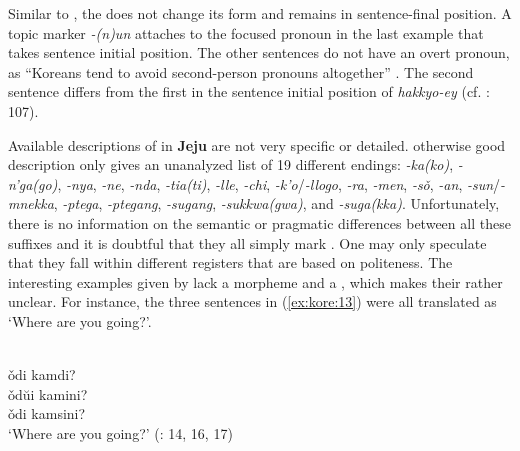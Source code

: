 \noindent Similar to , the  does not change its form and remains in sen\-tence-final position. A topic marker \textit{-(n)un} attaches to the focused pronoun in the last example that takes sentence initial position. The other sentences do not have an overt pronoun, as “Koreans tend to avoid second-person pronouns altogether” \citep[75]{Song2005}. The second sentence differs from the first in the sentence initial position of \textit{hakkyo-ey} (cf. \citealt{Song2005}: 107).

Available descriptions of  in \textbf{Jeju} are not very specific or detailed.  otherwise good description only gives an unanalyzed list of 19 different  endings: \textit{-ka(ko)}, \textit{-n’ga(go)}, \textit{-nya}, \textit{-ne}, \textit{-nda}, \textit{-tia(ti)}, \textit{-lle}, \textit{-chi}, \textit{-k’o}/\textit{-llogo}, \textit{-ra}, \textit{-men}, \textit{-sǒ}, \textit{-an}, \textit{-sun}/\textit{-mnekka}, \textit{-ptega}, \textit{-ptegang}, \textit{-sugang}, \textit{-sukkwa(gwa)}, and \textit{-suga(kka)}. Unfortunately, there is no information on the semantic or pragmatic differences between all these suffixes and it is doubtful that they all simply mark . One may only speculate that they fall within different registers that are based on politeness. The  interesting examples given by \citet{Kiaer2014} lack a morpheme  and a , which makes their  rather unclear. For instance, the three sentences in (\ref{ex:kore:13}) were all translated as ‘Where are you going?’.

\ea%
    \label{ex:kore:13}
    \\
    \ea
      ǒdi  kamdi?\\
    
    \ex
      ǒdŭi  kamini?\\
    
    \ex
      ǒdi  kamsini?\\
    \glt ‘Where are you going?’ (\citealt{Kiaer2014}: 14, 16, 17)
    \z
    \z 

